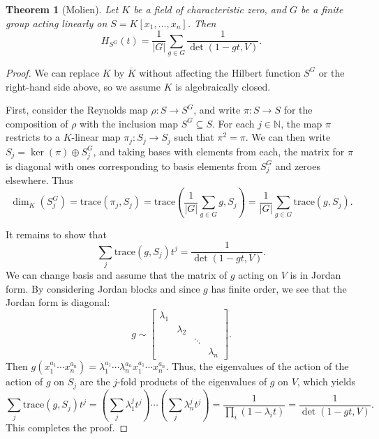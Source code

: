 \documentclass[12pt]{amsart}
\newtheorem{theorem}{Theorem}[section]
\theoremstyle{definition}
\numberwithin{equation}{theorem}
\def\ker{\operatorname{ker}}
\def\NN{\mathbb{N}}
\def\to{\longrightarrow}
\begin{document}
\begin{theorem}[Molien] Let $K$ be a field of characteristic zero, and $G$ be a finite group acting linearly on $S=K[x_1,\dots,x_n]$. Then
\[ H_{S^G}(t) = \frac{1}{|G|} \sum_{g\in G} \frac{1}{\det(1- g t, V)}.\]
\end{theorem}
\begin{proof} We can replace $K$ by $\overline{K}$ without affecting the Hilbert function $S^G$ or the right-hand side above, so we assume $K$ is algebraically closed.

First, consider the Reynolds map $\rho: S\to S^G$, and write $\pi: S \to S$ for the composition of $\rho$ with the inclusion map $S^G \subseteq S$. For each $j\in \NN$, the map $\pi$ restricts to a $K$-linear map $\pi_j : S_j \to S_j$ such that $\pi^2=\pi$. We can then write $S_j = \ker(\pi) \oplus S^G_j$, and taking bases with elements from each, the matrix for $\pi$ is diagonal with ones corresponding to basis elements from $S^G_j$ and zeroes elsewhere. Thus 
\[ \dim_K(S^G_j) = \mathrm{trace}(\pi_j, S_j) =  \mathrm{trace}(\frac{1}{|G|} \sum_{g\in G} g, S_j) = \frac{1}{|G|}  \sum_{g\in G}\mathrm{trace}(g, S_j).\]

It remains to show that
\[ \sum_j \mathrm{trace}(g, S_j) t^j = \frac{1}{\det(1 - g t, V)}.\]
We can change basis and assume that the matrix of $g$ acting on $V$ is in Jordan form. By considering Jordan blocks and since $g$ has finite order, we see that the Jordan form is diagonal:
\[ g \sim  \begin{bmatrix} \lambda_1 & & &\\ & \lambda_2 & & \\ & & \ddots &  \\ & & & \lambda_n\end{bmatrix}.\]
Then $g(x_1^{a_1} \cdots x_n^{a_n}) = \lambda_1^{a_1} \cdots \lambda_n^{a_n} x_1^{a_1} \cdots x_n^{a_n}$.
Thus, the eigenvalues of the action of the action of $g$ on $S_j$ are the $j$-fold products of the eigenvalues of $g$ on $V$, which yields
\[ \sum_j \mathrm{trace}(g, S_j) t^j = \left( \sum_j \lambda_1^j t^j\right) \cdots \left( \sum_j \lambda_n^j t^j\right) = \frac{1}{\prod_i (1 - \lambda_i t)}  = \frac{1}{\det(1 - gt,V)}.\]  This completes the proof.
\end{proof}
\end{document}
